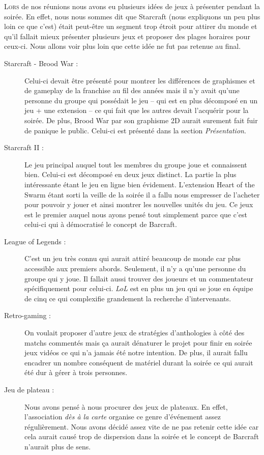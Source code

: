 \lettrine{L}{ors} de nos réunions nous avons eu plusieurs idées de jeux
à présenter pendant la soirée. En effet, nous nous sommes dit que
Starcraft (nous expliquons un peu plus loin ce que c'est) était
peut-être un segment trop étroit pour attirer du monde et qu'il fallait
mieux présenter plusieurs jeux et proposer des plages horaires pour
ceux-ci. Nous allons voir plus loin que cette idée ne fut pas retenue au
final.

\begin{description}

\item[Starcraft - Brood War :] Celui-ci devait être présenté pour
montrer les différences de graphismes et de gameplay de la franchise au
fil des années mais il n'y avait qu'une personne du groupe qui possédait
le jeu -- qui est en plus décomposé en un jeu + une extension -- ce qui
fait que les autres devait l'acquérir pour la soirée.  De plus, \og
Brood War \fg{} par son graphisme 2D aurait surement fait fuir de
panique le public.  Celui-ci est présenté dans la section
\emph{Présentation}.

\item[Starcraft II :] Le jeu principal auquel tout les membres du groupe
joue et connaissent bien. Celui-ci est décomposé en deux jeux distinct.
La partie la plus intéressante étant le jeu en ligne bien évidement.
L'extension \og Heart of the Swarm \fg{} étant sorti la veille de la
soirée il a fallu nous empresser de l'acheter pour pouvoir y jouer et
ainsi montrer les nouvelles unités du jeu. Ce jeux est le premier auquel
nous ayons pensé tout simplement parce que c'est celui-ci qui à
démocratisé le concept de Barcraft.

\item[League of Legends :] C'est un jeu très connu qui aurait attiré
beaucoup de monde car plus accessible aux premiers abords. Seulement, il
n'y a qu'une personne du groupe qui y joue. Il fallait aussi trouver des
joueurs et un commentateur spécifiquement pour celui-ci. \emph{LoL} est en plus
un jeu qui se joue en équipe de cinq ce qui complexifie grandement la
recherche d'intervenants.

\item[Retro-gaming :] On voulait proposer d'autre jeux de stratégies
d'anthologies à côté des matchs commentés mais ça aurait dénaturer le
projet pour finir en soirée jeux vidéos ce qui n'a jamais été notre
intention. De plus, il aurait fallu encadrer un nombre conséquent de
matériel durant la soirée ce qui aurait été dur à gérer à trois
personnes.

\item[Jeu de plateau :] Nous avons pensé à nous procurer des jeux de
plateaux. En effet, l'association \emph{dès à la carte} organise ce
genre d'événement assez régulièrement. Nous avons décidé assez vite de
ne pas retenir cette idée car cela aurait causé trop de dispersion dans
la soirée et le concept de Barcraft n'aurait plus de sens.

\end{description}

